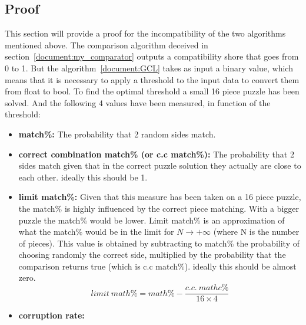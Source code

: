 \documentclass{article}
\begin{document}
\subsection{Proof}

This section will provide a proof for the incompatibility of
the two algorithms mentioned above.
\newline \newline
The comparison algorithm deceived in section~\ref{document:my_comparator} outputs a compatibility
shore that goes from 0 to 1.\newline
But the algorithm~\ref{document:GCL} takes as input a binary value,
which means that it is necessary to apply a threshold to the input
data to convert them from float to bool.
\newline \newline
To find the optimal threshold a small 16 piece puzzle has been solved.
And the following 4 values have been measured, in function of the threshold:

\begin{itemize}
  \item \textbf{match\%:}\newline
  The probability that 2 random sides match.
  
  \item \textbf{correct combination match\% (or c.c match\%):}\newline
  The probability that 2 sides match given that in the correct puzzle
  solution they actually are close to each other. ideally this should be 1.
  
  \item \textbf{limit match\%:}\newline
  Given that this measure has been taken on a 16 piece puzzle,
  the match\% is highly influenced by the correct piece matching.
  With a bigger puzzle the match\% would be lower.
  Limit match\% is an approximation of what the match\%
  would be in the limit for \(N \rightarrow + \infty\) (where N is the number of pieces).
  This value is obtained by subtracting to match\%
  the probability of choosing randomly the correct side,
  multiplied by the probability that the comparison returns true
  (which is c.c match\%). ideally this should be almost zero.
  \[limit \: math\% = math\% - \frac{c.c. \: mathc\%}{16 \times 4}\]
  
  \item \textbf{corruption rate:}\newline
\end{itemize}
\end{document}
